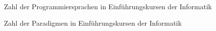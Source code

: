 \begin{figure}[h!]
    \centering
    
    \caption{Zahl der Programmiersprachen in Einführungskursen der Informatik}
\end{figure}

\begin{figure}[h!]
    \centering
    
    \caption{Zahl der Paradigmen in Einführungskursen der Informatik}
\end{figure}